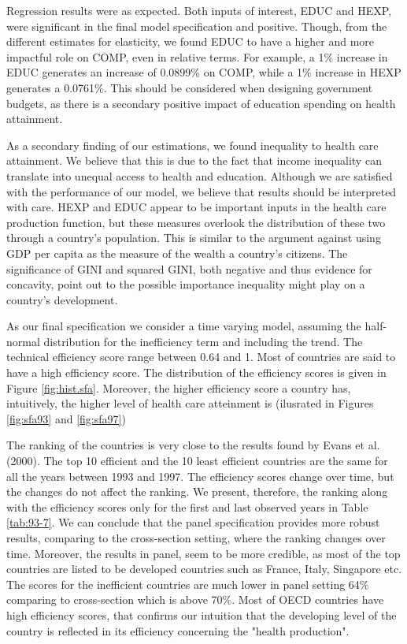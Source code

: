 \documentclass[12pt,a4paper]{article}\usepackage[]{graphicx}\usepackage[]{color}
\begin{document}
Regression results were as expected. Both inputs of interest, EDUC and HEXP, were significant in the final model specification and positive. Though, from the different estimates for elasticity, we found EDUC to have a higher and more impactful role on COMP, even in relative terms. For example, a 1\% increase in EDUC generates an increase of 0.0899\% on COMP, while a 1\% increase in HEXP generates a 0.0761\%. This should be considered when designing government budgets, as there is a secondary positive impact of education spending on health attainment. 

As a secondary finding of our estimations, we found inequality to health care attainment. We believe that this is due to the fact that income inequality can translate into unequal access to health and education.  Although we are satisfied with the performance of our model, we believe that results should be interpreted with care. HEXP and EDUC appear to be important inputs in the health care production function, but these measures overlook the distribution of these two through a country's population. This is similar to the argument against using GDP per capita as the measure of the wealth a country's citizens. The significance of GINI and squared GINI, both negative and thus evidence for concavity, point out to the possible importance inequality might play on a country's development.

As our final specification we consider a time varying model, assuming the half-normal distribution for the inefficiency term and including the trend. The technical efficiency score range between 0.64 and 1.  Most of countries are said to have a high efficiency score. The distribution of the efficiency scores is given in Figure \ref{fig:hist.sfa}. Moreover, the higher efficiency score a country has, intuitively, the higher level of health care atteinment is (ilusrated in Figures \ref{fig:sfa93} and \ref{fig:sfa97})

The ranking of the countries is very close to the results found by Evans et al. (2000). The top 10 efficient and the 10 least efficient countries are the same for all the years between 1993 and 1997. The efficiency scores change over time, but the changes do not affect the ranking. We present, therefore, the ranking along with the efficiency scores only for the first and last observed years in Table \ref{tab:93-7}. We can conclude that the panel specification provides more robust results, comparing to the cross-section setting, where the ranking changes over time. Moreover, the results in panel, seem to be more credible, as most of the top countries are listed to be developed countries such as France, Italy, Singapore etc. The scores for the inefficient countries are much lower in panel setting 64\% comparing to cross-section which is above 70\%. Most of OECD countries have high efficiency scores, that confirms our intuition that  the developing level of the country is reflected in its efficiency concerning the "health production".
\end{document}
